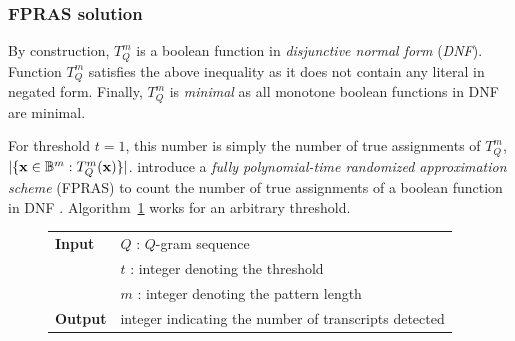 \subsubsection{FPRAS solution}

By construction, $T_{Q}^{m}$ is a boolean function in \emph{disjunctive normal form} (\emph{DNF}).
Function $T_{Q}^{m}$ satisfies the above inequality as it does not contain any literal in negated form.
Finally, $T_{Q}^{m}$ is \emph{minimal} as all monotone boolean functions in DNF are minimal.

For threshold $t=1$, this number is simply the number of true assignments of $T_{Q}^{m}$, \ie $| \{ \mathbf{x} \in \mathbb {B}^{m} : T_{Q}^{m}(\mathbf{x}) \} |$.
\citeauthor{Karp1989} introduce a \emph{fully polynomial-time randomized approximation scheme} (FPRAS) \citep{Vazirani2001} to count the number of true assignments of a boolean function in DNF \citep{Karp1989}.
Algorithm~\ref{alg:qgram-specificity} works for an arbitrary threshold.

\begin{figure}[b]
\begin{center}
\begin{minipage}[t]{.8\textwidth}
\begin{algorithm}[H]
\begin{tabular}{ll}
\textbf{Input}  & $Q$ : $Q$-gram sequence\\
				& $t$ : integer denoting the threshold\\
				& $m$ : integer denoting the pattern length\\
\textbf{Output} & integer indicating the number of transcripts detected\\
\end{tabular}
\label{alg:qgram-specificity}
\end{algorithm}
\end{minipage}
\end{center}
\end{figure}

